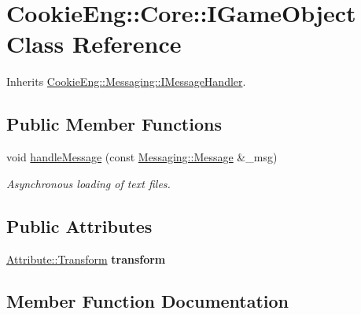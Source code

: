 \hypertarget{class_cookie_eng_1_1_core_1_1_i_game_object}{}\section{Cookie\+Eng\+:\+:Core\+:\+:I\+Game\+Object Class Reference}
\label{class_cookie_eng_1_1_core_1_1_i_game_object}


Inherits \hyperlink{class_cookie_eng_1_1_messaging_1_1_i_message_handler}{Cookie\+Eng\+::\+Messaging\+::\+I\+Message\+Handler}.

\subsection*{Public Member Functions}
\begin{DoxyCompactItemize}
\item 
void \hyperlink{class_cookie_eng_1_1_core_1_1_i_game_object_a84648d30ac6fc65183a6f6f49f939eb2}{handle\+Message} (const \hyperlink{class_cookie_eng_1_1_messaging_1_1_message}{Messaging\+::\+Message} \&\+\_\+msg)
\begin{DoxyCompactList}\small\item\em Asynchronous loading of text files. \end{DoxyCompactList}\end{DoxyCompactItemize}
\subsection*{Public Attributes}
\begin{DoxyCompactItemize}
\item 
\mbox{\label{class_cookie_eng_1_1_core_1_1_i_game_object_a6f1cd422877ced5f95d8e913dc0f15dd}} 
\hyperlink{class_cookie_eng_1_1_attribute_1_1_transform}{Attribute\+::\+Transform} {\bfseries transform}
\end{DoxyCompactItemize}


\subsection{Member Function Documentation}
\mbox{\label{class_cookie_eng_1_1_core_1_1_i_game_object_a84648d30ac6fc65183a6f6f49f939eb2}} 
